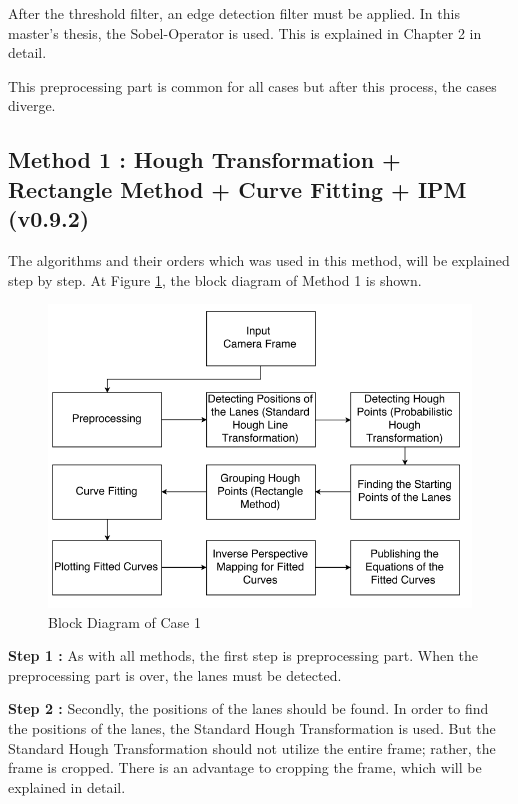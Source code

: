 After the threshold filter, an edge detection filter must be applied. In this master's thesis, the Sobel-Operator is used. This is explained in Chapter 2 in detail.
 
This preprocessing part is common for all cases but after this process, the cases diverge. 
 
%
\subsection{Method 1 : Hough Transformation + Rectangle Method + Curve Fitting + IPM (v0.9.2)}\label{sec:Case 1}

The algorithms and their orders which was used in this method, will be explained step by step. At Figure \ref{fig:Case1_BlockDiagram}, the block diagram of Method 1 is shown.



\begin{figure}[H]
 \centering
  \includegraphics[width=1\textwidth]{./Bilder/Case1_BlockDiagram.png}		 \caption{Block Diagram of Case 1}
  \label{fig:Case1_BlockDiagram}
\end{figure}



\textbf{Step 1 : }As with all methods, the first step is preprocessing part. When the preprocessing part is over, the lanes must be detected. 

\textbf{Step 2 : }Secondly, the positions of the lanes should be found. In order to find the positions of the lanes, the Standard Hough Transformation is used. But the Standard Hough Transformation should not utilize the entire frame; rather, the frame is cropped. There is an advantage to cropping the frame, which will be explained in detail.


